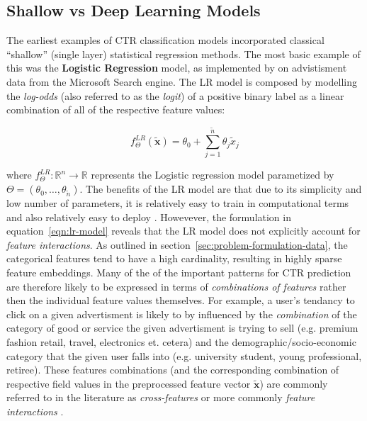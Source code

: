 \documentclass{mldsmsc}
\begin{document}
\subsection{Shallow vs Deep Learning Models}

The earliest examples of CTR classification models incorporated classical ``shallow'' 
(single layer) statistical regression methods. The most basic example of this was 
the \textbf{Logistic Regression} model, as implemented by \cite{RefWorks:richardson2007predicting} on
advistisment data from the Microsoft Search engine. The LR model
is composed by modelling the \emph{log-odds} (also referred to as the \emph{logit}) 
of a positive binary label as a linear combination
of all of the respective feature values:

\begin{equation}
\label{eqn:lr-model}
f_{\Theta}^{LR}(\tilde{\mathbf{x}}) = \theta_0 + \sum_{j=1}^{\tilde{n}}\theta_j \tilde{x}_j
\end{equation}

where $f_{\Theta}^{LR}: \mathbb{R}^n \rightarrow \mathbb{R}$ represents the Logistic regression
model parametized by $\Theta = (\theta_0, \ldots, \theta_{\tilde{n}})$. The benefits of the LR
model are that due to its simplicity and low number of parameters, it is relatively easy to
train in computational terms and also relatively easy to deploy \citep{RefWorks:zhang2021deep}.
Howevever, the formulation in equation~\ref{eqn:lr-model} reveals that the LR model does not explicitly 
account for \emph{feature interactions}.
As outlined in section~\ref{sec:problem-formulation-data}, the categorical features tend to have a
high cardinality, resulting in highly sparse feature embeddings. Many of the of the important patterns
for CTR prediction are therefore likely to be expressed in terms of \emph{combinations of features}
rather then the individual feature values themselves. For example, a user's tendancy to
click on a given advertisment is likely to by influenced by the \emph{combination} of the category
of good or service the given advertisment is trying to sell (e.g. premium fashion retail, travel, electronics et. cetera)
and the demographic/socio-economic category that the given user falls into (e.g. university student, young professional, retiree).
These features combinations (and the corresponding combination of respective field values 
in the preprocessed feature vector $\tilde{\mathbf{x}}$) are commonly referred to in
the literature as \emph{cross-features} \citep{RefWorks:zhang2023memonet:} or more commonly
\emph{feature interactions} \citep{RefWorks:cheng2016wide,RefWorks:xiao2017attentional,RefWorks:song2019autoint}.
\end{document}
